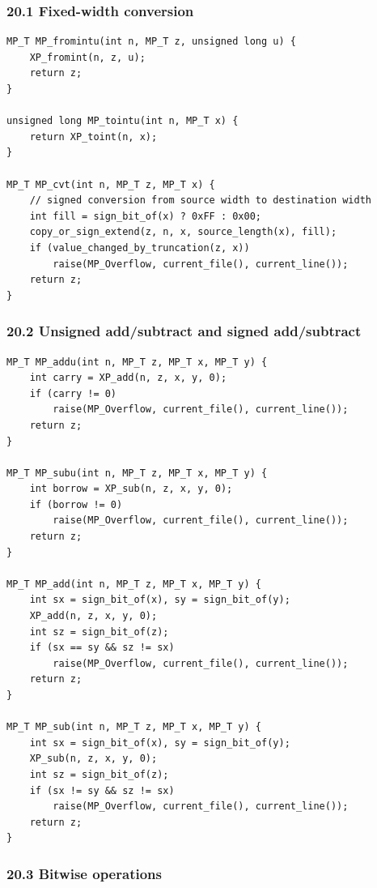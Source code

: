 \documentclass[11pt]{article}
\begin{document}
\subsubsection{20.1 Fixed-width conversion}\label{fixed-width-conversion}

\begin{verbatim}
MP_T MP_fromintu(int n, MP_T z, unsigned long u) {
    XP_fromint(n, z, u);
    return z;
}

unsigned long MP_tointu(int n, MP_T x) {
    return XP_toint(n, x);
}

MP_T MP_cvt(int n, MP_T z, MP_T x) {
    // signed conversion from source width to destination width
    int fill = sign_bit_of(x) ? 0xFF : 0x00;
    copy_or_sign_extend(z, n, x, source_length(x), fill);
    if (value_changed_by_truncation(z, x))
        raise(MP_Overflow, current_file(), current_line());
    return z;
}
\end{verbatim}

\subsubsection{20.2 Unsigned add/subtract and signed add/subtract}\label{unsigned-addsubtract-and-signed-addsubtract}

\begin{verbatim}
MP_T MP_addu(int n, MP_T z, MP_T x, MP_T y) {
    int carry = XP_add(n, z, x, y, 0);
    if (carry != 0)
        raise(MP_Overflow, current_file(), current_line());
    return z;
}

MP_T MP_subu(int n, MP_T z, MP_T x, MP_T y) {
    int borrow = XP_sub(n, z, x, y, 0);
    if (borrow != 0)
        raise(MP_Overflow, current_file(), current_line());
    return z;
}

MP_T MP_add(int n, MP_T z, MP_T x, MP_T y) {
    int sx = sign_bit_of(x), sy = sign_bit_of(y);
    XP_add(n, z, x, y, 0);
    int sz = sign_bit_of(z);
    if (sx == sy && sz != sx)
        raise(MP_Overflow, current_file(), current_line());
    return z;
}

MP_T MP_sub(int n, MP_T z, MP_T x, MP_T y) {
    int sx = sign_bit_of(x), sy = sign_bit_of(y);
    XP_sub(n, z, x, y, 0);
    int sz = sign_bit_of(z);
    if (sx != sy && sz != sx)
        raise(MP_Overflow, current_file(), current_line());
    return z;
}
\end{verbatim}

\subsubsection{20.3 Bitwise operations}\label{bitwise-operations}
\end{document}
